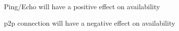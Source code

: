 
\begin{description}[style=nextline]
  \item[S1\label{s1}] Ping/Echo will have a positive effect on availability
  \item[S2\label{s2}] \gls{p2p} connection will have a negative effect on availability
\end{description}
